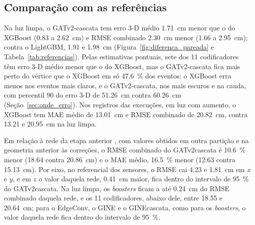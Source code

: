\subsection{Comparação com as referências}
\label{sec:comparacao_referencias}

Na luz limpa, o GATv2-cascata tem erro 3-D médio \qty{1.71}{\cm} menor que o do XGBoost (\num{0.83} a \qty{2.62}{\cm}) e RMSE combinado \qty{2.30}{\cm} menor (\num{1.66} a \qty{2.95}{\cm}); contra o LightGBM, \num{1.91} e \qty{1.98}{\cm} (Figura~\ref{fig:diferenca_pareada} e Tabela~\ref{tab:referencias}). Pelas estimativas pontuais, sete dos \num{11} codificadores têm erro 3-D médio menor que o do XGBoost, mas o GATv2-cascata fica mais perto do vértice que o XGBoost em só \qty{47.6}{\percent} dos eventos: o XGBoost erra menos nos eventos mais claros, e o GATv2-cascata, nos mais escuros e na cauda, com percentil 90 do erro 3-D de \qty{51.26}{\cm} contra \qty{60.26}{\cm} (Seção~\ref{sec:onde_erro}). Nos registros das execuções, em luz com aumento, o XGBoost tem MAE médio de \qty{13.01}{\cm} e RMSE combinado de \qty{20.82}{\cm}, contra \num{13.21} e \qty{20.95}{\cm} na luz limpa.

Em relação à rede da etapa anterior \cite{vicentin2024study}, com valores obtidos em outra partição e na geometria anterior às correções, o RMSE combinado do GATv2\discretionary{-}{-}{-}cascata é \qty{10.6}{\percent} menor (\num{18.64} contra \qty{20.86}{\cm}) e o MAE médio, \qty{16.5}{\percent} menor (\num{12.63} contra \qty{15.13}{\cm}). Por eixo, no referencial dos sensores, o RMSE cai \num{4.23} e \qty{1.81}{\cm} em $x$ e $y$, e em $z$ o valor daquela rede, \qty{0.41}{\cm} maior, fica dentro do intervalo de \qty{95}{\percent} do GATv2\discretionary{-}{-}{-}cascata. Na luz limpa, os \textit{boosters} ficam a até \qty{0.24}{\cm} do RMSE combinado daquela rede, e os \num{11} codificadores, abaixo dele, entre \num{18.55} e \qty{20.64}{\cm}; para o EdgeConv, o GINE e o GINE\discretionary{-}{-}{-}cascata, como para os \textit{boosters}, o valor daquela rede fica dentro do intervalo de \qty{95}{\percent}.

\begin{table}[H]
  \centering
  \caption{Erros de teste do GATv2-cascata, do GPS e das referências, em cm, no referencial dos sensores; o baricentro tem calibração quadrática. \textsuperscript{a}RMSE por eixo citados, de outra partição (\qty{80}{\percent} e \qty{20}{\percent}) e da geometria anterior às correções \cite{vicentin2024study}, com eixos convertidos para este referencial; RMSE combinado e MAE médio calculados a partir dos valores publicados por eixo. \textsuperscript{}Outra simulação \cite{marinho2025apex}; larguras lidas da Figura~2 do artigo a \qty{0.26}{\cm} por \textit{pixel}, em luz detectada igual com o rendimento médio (\qty{2.9}{\MeV}) ou com o mínimo (\qty{4.9}{\MeV}) e em energia igual (\qty{10}{\MeV}); as duas larguras transversais aparecem na mesma célula, sem atribuição a $x$ e $y$; MAE não disponível.}
  \label{tab:referencias}
  
\end{table}

